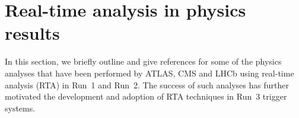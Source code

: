\section{Real-time analysis in physics results}
\label{sec:RTA_physics}

In this section, we briefly outline and give references for some of the physics analyses that have been performed by ATLAS, CMS and LHCb using real-time analysis (RTA) in Run~1 and Run~2. The success of such analyses has further motivated the development and adoption of RTA techniques in Run~3 trigger systems. %

\iffalse

